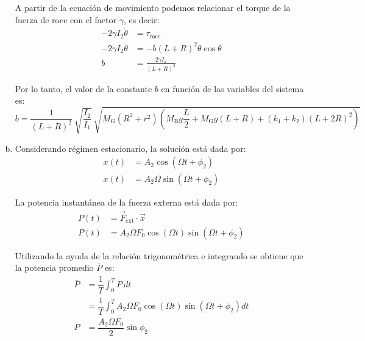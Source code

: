 \begin{enumerate}[a)]
	A partir de la ecuaci\'on de movimiento podemos relacionar el torque de la fuerza de roce con el factor $\gamma$, es decir:
	\begin{align*}
		- 2\gamma I_2 \dot \theta&= \tau_{\text{roce}} \\
		- 2\gamma I_2 \dot \theta &= - b (L+R)^2 \dot \theta \cos \theta\\
		b&=\frac{2\gamma I_2}{{(L+R)}^2}
	\end{align*}
	
	Por lo tanto, el valor de la constante $b$ en funci\'on de las variables del sistema es:
	\begin{equation*}
	b= \frac{1}{{(L+R)}^2} \ \sqrt{\frac{I_2}{I_1}} \ \sqrt{ M_{\text{G}}\left( R^2+r^2 \right) \left( M_{\text{B}}g\frac{L}{2} + M_{\text{G}}g(L+R) + (k_1+k_2){(L+2R)}^2 \right) }
	\end{equation*}
	
\item Considerando r\'egimen estacionario, la soluci\'on est\'a dada por:
	\begin{align*}
		x(t) &= A_2\cos (\Omega t + \phi_2) \\
		\dot x (t) &= A_2 \Omega \sin (\Omega t + \phi_2)
	\end{align*}

	La potencia instant\'anea de la fuerza externa est\'a dada por:
	\begin{align*}
		P(t) &= \vec{F}_{\text{ext}} \cdot \dot{\vec{x}} \\
	    P(t) &= A_2 \Omega F_0 \cos(\Omega t) \sin (\Omega t + \phi_2)
	\end{align*}

	Utilizando la ayuda de la relaci\'on trigonom\'etrica e integrando se obtiene que la potencia promedio $\bar{P}$ es:
	\begin{align*}
		\bar{P} &= \dfrac{1}{T} \int_0^T P \ dt \\
		&= \dfrac{1}{T} \int_0^T A_2 \Omega F_0 \cos(\Omega t) \sin (\Omega t + \phi_2) dt \\
		\bar{P} &= \dfrac{A_2 \Omega F_0}{2} \sin \phi_2
	\end{align*}

\end{enumerate}